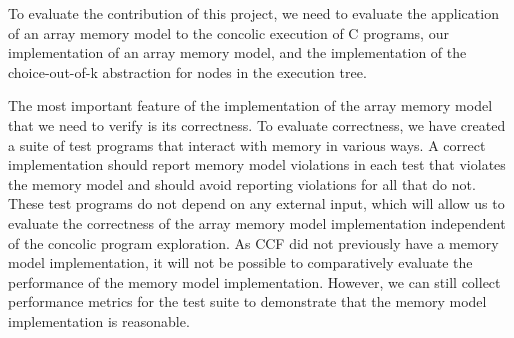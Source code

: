 \documentclass[12pt,twoside]{report}
\begin{document}
%

To evaluate the contribution of this project, we need to evaluate the application of an array memory model to the concolic execution of C programs, our implementation of an array memory model, and the implementation of the choice-out-of-k abstraction for nodes in the execution tree.

The most important feature of the implementation of the array memory model that we need to verify is its correctness. To evaluate correctness, we have created a suite of test programs that interact with memory in various ways. A correct implementation should report memory model violations in each test that violates the memory model and should avoid reporting violations for all that do not. These test programs do not depend on any external input, which will allow us to evaluate the correctness of the array memory model implementation independent of the concolic program exploration. As CCF did not previously have a memory model implementation, it will not be possible to comparatively evaluate the performance of the memory model implementation. However, we can still collect performance metrics for the test suite to demonstrate that the memory model implementation is reasonable.
\end{document}
